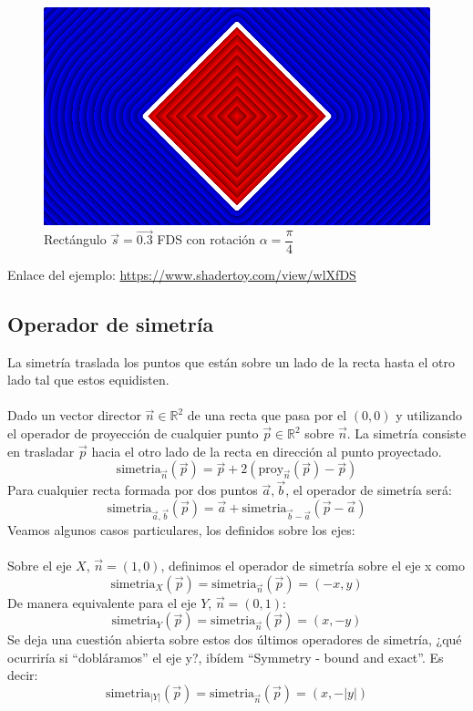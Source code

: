 \begin{figure}[H]
  \centering
  \captionsetup{justification=centering}%
  \includegraphics[width=1.0\textwidth]{secciones/imagenes/sdf/2d/sdf_rotacion.png}
  \caption{Rectángulo \(\Vec{s}=\Vec{0.3}\) FDS con rotación \(\alpha=\dfrac{\pi}{4}\)}
  \label{fig:rotacion}
\end{figure}

Enlace del ejemplo:
\url{https://www.shadertoy.com/view/wlXfDS}

\subsection{Operador de simetría}
La simetría traslada los puntos que están sobre un lado de la recta hasta el otro lado tal que estos equidisten.\\\\ Dado un vector director \(\Vec{n}\in\mathbb{R}^2\) de una recta que pasa por el \((0,0)\) y utilizando el operador de proyección de cualquier punto \(\Vec{p}\in\mathbb{R}^2\) sobre \(\Vec{n}\). La simetría consiste en trasladar \(\Vec{p}\) hacia el otro lado de la recta en dirección al punto proyectado.
\[\text{simetria}_{\Vec{n}}(\Vec{p})=\Vec{p} + 2(\text{proy}_{\Vec{n}}(\Vec{p})-\Vec{p})\]
Para cualquier recta formada por dos puntos \(\Vec{a}, \Vec{b}\), el operador de simetría será:
\[\text{simetria}_{\Vec{a},\Vec{b}}(\Vec{p}) =\Vec{a}+ \text{simetria}_{\Vec{b}-\Vec{a}}(\Vec{p}-\Vec{a})\]
Veamos algunos casos particulares, los definidos sobre los ejes:\\\\
Sobre el eje \(X\), \(\Vec{n}=(1,0)\), definimos el operador de simetría sobre el eje x como
\[\text{simetria}_{X}(\Vec{p})=\text{simetria}_{\Vec{n}}(\Vec{p})=(-x, y)\]
De manera equivalente para el eje \(Y\), \(\Vec{n}=(0,1)\):
\[\text{simetria}_{Y}(\Vec{p})=\text{simetria}_{\Vec{n}}(\Vec{p})=(x, -y)\]
Se deja una cuestión abierta sobre estos dos últimos operadores de simetría, ¿qué ocurriría si \enquote{dobláramos} el eje y?, ibídem \enquote{Symmetry - bound and exact}. Es decir:
\[\text{simetria}_{\vert Y\vert}(\Vec{p})=\text{simetria}_{\Vec{n}}(\Vec{p})=(x, -\vert y\vert)\]


